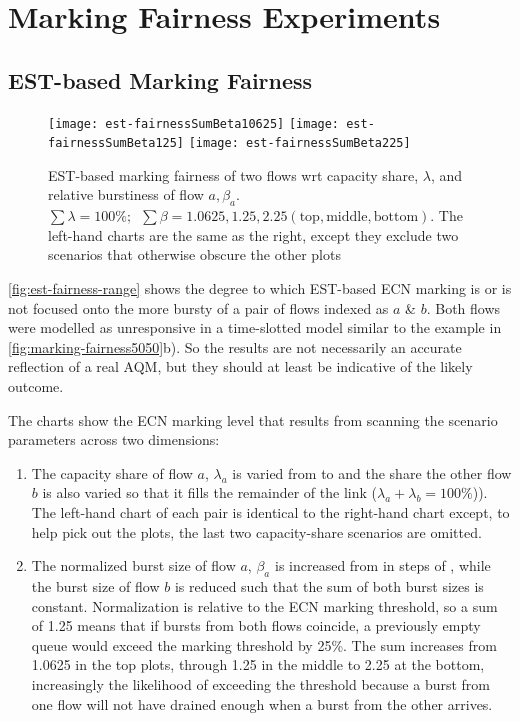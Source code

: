 \section{Marking Fairness Experiments}\label{sec:marking_fairness_expts}\label{sec:marking_fairness_discuss}

\subsection{EST-based Marking Fairness}\label{sec:marking_fairness_expts_est}

\begin{figure*}[t!]
	\centering
	\texttt{[image: est-fairnessSumBeta10625]}
	\texttt{[image: est-fairnessSumBeta125]}
	\texttt{[image: est-fairnessSumBeta225]}
	\caption{EST-based marking fairness of two flows wrt capacity share, \(\lambda\), and relative burstiness of flow \(a, \beta_a\).\\
	\(\sum\lambda=100\%; \enspace\sum\beta=1.0625, 1.25, 2.25 \mathrm{(top, middle, bottom)}\). 
	The left-hand charts are the same as the right, except they exclude two scenarios that otherwise obscure the other plots}\label{fig:est-fairness-range}
\end{figure*}

\autoref{fig:est-fairness-range} shows the degree to which EST-based ECN marking is or is not focused onto the more bursty of a pair of flows indexed as \(a\) \& \(b\). Both flows were modelled as unresponsive in a time-slotted model similar to the example in \autoref{fig:marking-fairness5050}b). So the results are not necessarily an accurate reflection of a real AQM, but they should at least be indicative of the likely outcome.

The charts show the ECN marking level that results from scanning the scenario parameters across two dimensions:
\begin{enumerate}
	\item The capacity share of flow \(a\), \(\lambda_a\) is varied from  to  and the share the other flow \(b\) is also varied so that it fills the remainder of the link (\(\lambda_a+\lambda_b=100\%\))). The left-hand chart of each pair is identical to the right-hand chart except, to help pick out the plots, the last two capacity-share scenarios are omitted.
	\item The normalized burst size of flow \(a\), \(\beta_a\) is increased from  in steps of , while the burst size of flow \(b\) is reduced such that the sum of both burst sizes is constant. Normalization is relative to the ECN marking threshold, so a sum of 1.25 means that if bursts from both flows coincide, a previously empty queue would exceed the marking threshold by 25\%. The sum increases from 1.0625 in the top plots, through 1.25 in the middle to 2.25 at the bottom, increasingly the likelihood of exceeding the threshold because a burst from one flow will not have drained enough when a burst from the other arrives.
\end{enumerate}

